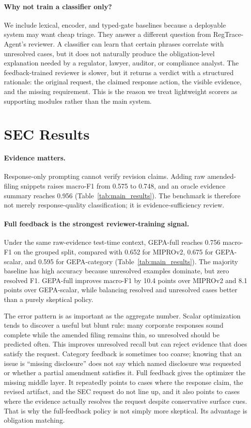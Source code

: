 \documentclass[11pt]{article}
\newcommand{\framework}{RegTrace-Agent}
\begin{document}
\paragraph{Why not train a classifier only?}
We include lexical, encoder, and typed-gate baselines because a deployable system may want cheap triage. They answer a different question from \framework{}'s reviewer. A classifier can learn that certain phrases correlate with unresolved cases, but it does not naturally produce the obligation-level explanation needed by a regulator, lawyer, auditor, or compliance analyst. The feedback-trained reviewer is slower, but it returns a verdict with a structured rationale: the original request, the claimed response action, the visible evidence, and the missing requirement. This is the reason we treat lightweight scorers as supporting modules rather than the main system.

\section{SEC Results}

\paragraph{Evidence matters.}
Response-only prompting cannot verify revision claims. Adding raw amended-filing snippets raises macro-F1 from 0.575 to 0.748, and an oracle evidence summary reaches 0.956 (Table~\ref{tab:main_results}). The benchmark is therefore not merely response-quality classification; it is evidence-sufficiency review.

\paragraph{Full feedback is the strongest reviewer-training signal.}
Under the same raw-evidence test-time context, GEPA-full reaches 0.756 macro-F1 on the grouped split, compared with 0.652 for MIPROv2, 0.675 for GEPA-scalar, and 0.595 for GEPA-category (Table~\ref{tab:main_results}). The majority baseline has high accuracy because unresolved examples dominate, but zero resolved F1. GEPA-full improves macro-F1 by 10.4 points over MIPROv2 and 8.1 points over GEPA-scalar, while balancing resolved and unresolved cases better than a purely skeptical policy.

The error pattern is as important as the aggregate number. Scalar optimization tends to discover a useful but blunt rule: many corporate responses sound complete while the amended filing remains thin, so unresolved should be predicted often. This improves unresolved recall but can reject evidence that does satisfy the request. Category feedback is sometimes too coarse; knowing that an issue is ``missing disclosure'' does not say which named disclosure was requested or whether a partial amendment satisfies it. Full feedback gives the optimizer the missing middle layer. It repeatedly points to cases where the response claim, the revised artifact, and the SEC request do not line up, and it also points to cases where the evidence actually resolves the request despite conservative surface cues. That is why the full-feedback policy is not simply more skeptical. Its advantage is obligation matching.
\end{document}
